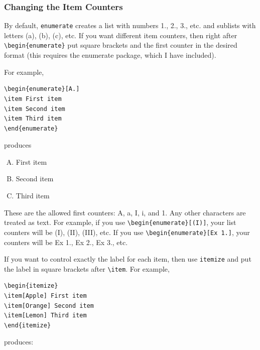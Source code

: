 \documentclass[12pt]{article}
\begin{document}
\subsubsection{Changing the Item Counters}

By default, \verb|enumerate| creates a list with numbers 1., 2., 3., etc. and sublists with letters (a), (b), (c), etc. If you want different item counters, then right after \verb|\begin{enumerate}| put square brackets and the first counter in the desired format (this requires the enumerate package, which I have included).

For example,

\begin{verbatim}
\begin{enumerate}[A.]
\item First item
\item Second item
\item Third item
\end{enumerate}
\end{verbatim}
produces

\begin{enumerate}[A.]
\item First item
\item Second item
\item Third item
\end{enumerate}

These are the allowed first counters: A, a, I, i, and 1. Any other characters are treated as text. For example, if you use \verb|\begin{enumerate}[(I)]|, your list counters will be (I), (II), (III), etc. If you use \verb|\begin{enumerate}[Ex 1.]|, your counters will be Ex 1., Ex 2., Ex 3., etc.

If you want to control exactly the label for each item, then use \verb|itemize| and put the label in square brackets after \verb|\item|. For example,

\begin{verbatim}
\begin{itemize}
\item[Apple] First item
\item[Orange] Second item
\item[Lemon] Third item
\end{itemize}
\end{verbatim}
produces:
\end{document}
